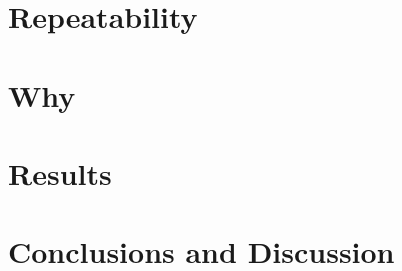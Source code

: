 \documentclass{sig-alternate-br}
\begin{document}
\section{Repeatability}
\section{Why}
\section{Results}
\label{sec:results}

\section{Conclusions and Discussion}
\label{sec:conclusions}


%


\balancecolumns

\onecolumn
\end{document}
